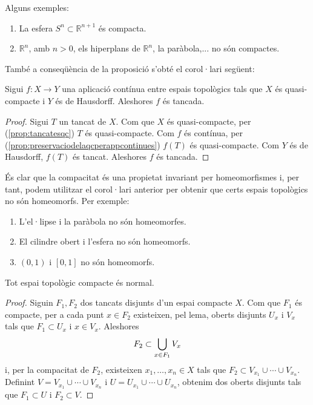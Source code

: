 \documentclass[../main.tex]{subfiles}
\begin{document}
\begin{ej}
\label{ej:espaiscompactes}
Alguns exemples:
\begin{enumerate}[(1)]
    \item La esfera $S^n\subset \mathbb{R}^{n+1}$ és compacta.
    \item $\mathbb{R}^n$, amb $n>0$, els hiperplans de $\mathbb{R}^n$, la paràbola,... no són compactes.
\end{enumerate}
També a conseqüència de la proposició s'obté el corol·lari següent:
\end{ej}

\begin{coro}
\label{coro:fentreqcihausdorffestancada} Sigui $f:X\rightarrow Y$ una aplicació contínua entre espais topològics tals que $X$ és quasi-compacte i $Y$ és de Hausdorff. Aleshores $f$ és tancada.
\end{coro}
\begin{proof}
 Sigui $T$ un tancat de $X$. Com que $X$ és quasi-compacte, per (\ref{prop:tancatesqc}) $T$ és quasi-compacte. Com $f$ és contínua, per (\ref{prop:preservaciodelaqcperappcontinues}) $f(T)$ és quasi-compacte. Com $Y$ és de Hausdorff, $f(T)$ és tancat. Aleshores $f$ és tancada.
\end{proof}

És clar que la compacitat és una propietat invariant per homeomorfismes i, per tant, podem utilitzar el corol·lari anterior per obtenir que certs espais topològics no són homeomorfs. Per exemple:
\begin{enumerate}[(1)]
    \item L'el·lipse i la paràbola no són homeomorfes.
    \item El cilindre obert i l'esfera no són homeomorfs.
    \item $(0,1)$ i $[0,1]$ no són homeomorfs.
\end{enumerate}

\begin{prop}
\label{prop:totespaicompacteesnormal} Tot espai topològic compacte és normal.
\end{prop}
\begin{proof}
 Siguin $F_1,F_2$ dos tancats disjunts d'un espai compacte $X$. Com que $F_1$ és compacte, per a cada punt $x\in F_2$ existeixen, pel lema, oberts disjunts $U_x$ i $V_x$ tals que $F_1\subset U_x$ i $x\in V_x$. Aleshores 
 \begin{equation}
     \notag
     F_2\subset\bigcup_{x\in F_1} V_x
 \end{equation}
 i, per la compacitat de $F_2$, existeixen $x_1,\ldots,x_n\in X$ tals que $F_2\subset V_{x_1}\cup\cdots\cup V_{x_n}$. Definint $V = V_{x_1}\cup\cdots\cup V_{x_n}$ i $U = U_{x_1}\cup\cdots\cup U_{x_n}$, obtenim dos oberts disjunts tals que $F_1\subset U$ i $F_2\subset V$.
\end{proof}
\end{document}
